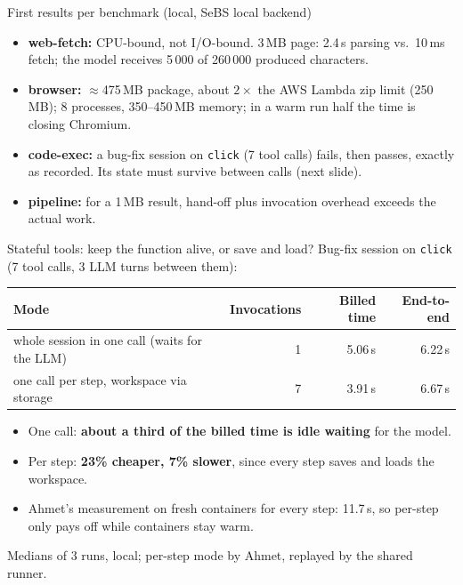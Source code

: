 \documentclass[aspectratio=169,11pt]{beamer}
\begin{document}
\begin{frame}{First results per benchmark (local, SeBS local backend)}
  \begin{itemize}
    \item \textbf{web-fetch:} CPU-bound, not I/O-bound. 3\,MB page: 2.4\,s parsing vs.\ 10\,ms fetch;
          the model receives 5\,000 of 260\,000 produced characters.
    \item \textbf{browser:} $\approx$475\,MB package, about $2\times$ the AWS Lambda zip limit (250\,MB);
          8 processes, 350--450\,MB memory; in a warm run half the time is closing Chromium.
    \item \textbf{code-exec:} a bug-fix session on \texttt{click} (7 tool calls) fails, then passes,
          exactly as recorded. Its state must survive between calls (next slide).
    \item \textbf{pipeline:} for a 1\,MB result, hand-off plus invocation overhead exceeds the actual work.
  \end{itemize}
\end{frame}

\begin{frame}{Stateful tools: keep the function alive, or save and load?}
  Bug-fix session on \texttt{click} (7 tool calls, 3 LLM turns between them):
  \vspace{0.5em}
  \begin{center}
  \begin{tabular}{@{}lrrr@{}}
    \toprule
    Mode & Invocations & Billed time & End-to-end \\
    \midrule
    whole session in one call (waits for the LLM) & 1 & 5.06\,s & 6.22\,s \\
    one call per step, workspace via storage       & 7 & 3.91\,s & 6.67\,s \\
    \bottomrule
  \end{tabular}
  \end{center}
  \begin{itemize}
    \item One call: \textbf{about a third of the billed time is idle waiting} for the model.
    \item Per step: \textbf{23\% cheaper, 7\% slower}, since every step saves and loads the workspace.
    \item Ahmet's measurement on fresh containers for every step: 11.7\,s,
          so per-step only pays off while containers stay warm.
  \end{itemize}
  \footnotesize Medians of 3 runs, local; per-step mode by Ahmet, replayed by the shared runner.
\end{frame}
\end{document}
